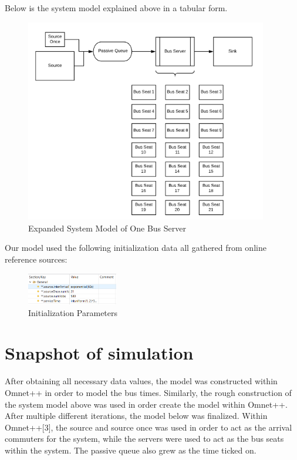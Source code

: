 \documentclass{article}
\begin{document}
    \vspace{1cm}
    Below is the system model explained above in a tabular form. 
 	\begin{figure}[h]
	\begin{center}
	\includegraphics[width=400px]{Model_Graphic_v2.png}
	\caption{Expanded System Model of One Bus Server}
	\end{center}
	\end{figure}
  
  Our model used the following initialization data all gathered from online reference sources:

  	\begin{figure}[h]
	\begin{center}
	\includegraphics[width=150px]{ini_file.png}
	\caption{Initialization Parameters}
	\end{center}
	\end{figure}

\section{Snapshot of simulation}
	After obtaining all necessary data values, the model was constructed within Omnet++ in order to model the bus times. Similarly, the rough construction of the system model above was used in order create the model within Omnet++. After multiple different iterations, the model below was finalized. Within Omnet++[3], the source and source once was used in order to act as the arrival commuters for the system, while the servers were used to act as the bus seats within the system. The passive queue also grew as the time ticked on.
    
\end{document}
